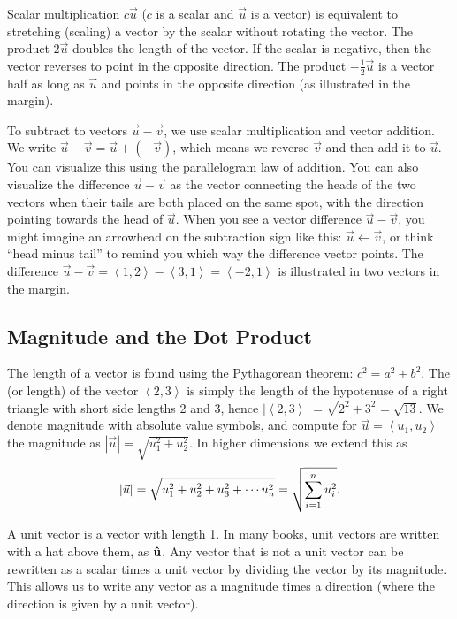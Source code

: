 Scalar multiplication $c\vec u$ ($c$ is a scalar and $\vec u$ is a vector) is equivalent to stretching (scaling) a vector by the scalar without rotating the vector. The product $2\vec u$ doubles the length of the vector. If the scalar is negative, then the vector reverses to point in the opposite direction.  The product $-\frac{1}{2}\vec u$ is a vector half as long as $\vec u$ and points in the opposite direction (as illustrated in the margin).

To subtract to vectors $\vec u-\vec v$, we use scalar multiplication and vector addition.  We write $\vec u-\vec v = \vec u +(-\vec v)$, which means we reverse $\vec v$ and then add it to $\vec u$.  You can visualize this using the parallelogram law of addition.  You can also visualize the difference $\vec u-\vec v$ as the vector connecting the heads of the two vectors when their tails are both placed on the same spot, with the direction pointing towards the head of $\vec u$.  When you see a vector difference $\vec u-\vec v$, you might imagine an arrowhead on the subtraction sign like this: $\vec u \leftarrow \vec v$, or think ``head  minus tail'' to remind you which way the difference vector points. The difference $\vec u - \vec v=\left<1,2\right> - \left<3,1\right> = \left<-2,1\right>$ is illustrated in two vectors in the margin.

\subsection{Magnitude and the Dot Product}
The length of a vector is found using the Pythagorean theorem: $c^2=a^2+b^2$.  The  (or length) of the vector $\left<2,3\right>$ is simply the length of the hypotenuse of a right triangle with short side lengths 2 and 3, hence $|\left<2,3\right>|=\sqrt{2^2+3^2}=\sqrt{13}$. We denote magnitude with absolute value symbols, and compute for $\vec u = \left<u_1,u_2\right>$ the magnitude as $|\vec u| = \sqrt{u_1^2+u_2^2}$.  In higher dimensions we extend this as $$\displaystyle |\vec u| = \sqrt{u_1^2+u_2^2+u_3^2+\cdots u_n^2} = \sqrt{\sum_{i=1}^n u_i^2}.$$ 

A unit vector is a vector with length 1. 
 In many books, unit vectors are written with a hat above them, as $\bf{\hat u}$.
Any vector that is not a unit vector can be rewritten as a scalar times a unit vector by dividing the vector by its magnitude. This allows us to write any vector as a magnitude times a direction (where the direction is given by a unit vector).
 
